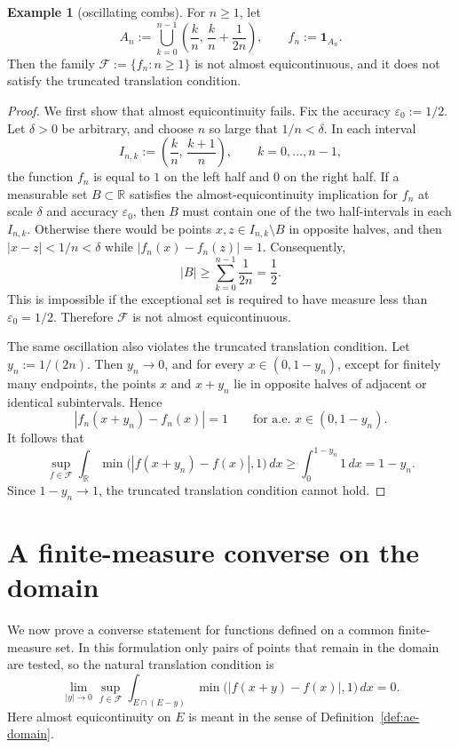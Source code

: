 \documentclass[11pt]{article}
\theoremstyle{plain}
\theoremstyle{definition}
\newtheorem{example}{Example}
\theoremstyle{remark}
\newcommand{\R}{\mathbb{R}}
\newcommand{\F}{\mathcal{F}}
\newcommand{\eps}{\varepsilon}
\newcommand{\meas}[1]{\lvert #1\rvert}
\begin{document}
\begin{example}[oscillating combs]\label{ex:combs}
For $n\ge1$, let
\[
    A_n:=
    \bigcup_{k=0}^{n-1}
    \left(\frac{k}{n},\,\frac{k}{n}+\frac{1}{2n}\right),
    \qquad
    f_n:=\mathbf 1_{A_n}.
\]
Then the family $\F:=\{f_n:n\ge1\}$ is not almost equicontinuous, and it
does not satisfy the truncated translation condition.
\end{example}

\begin{proof}
We first show that almost equicontinuity fails. Fix the accuracy
$\eps_0:=1/2$. Let $\delta>0$ be arbitrary, and choose $n$ so large that
$1/n<\delta$. In each interval
\[
    I_{n,k}:=\left(\frac{k}{n},\,\frac{k+1}{n}\right),
    \qquad k=0,\dots,n-1,
\]
the function $f_n$ is equal to $1$ on the left half and $0$ on the right half.
If a measurable set $B\subset\R$ satisfies the almost-equicontinuity
implication for $f_n$ at scale $\delta$ and accuracy $\eps_0$, then $B$ must
contain one of the two half-intervals in each $I_{n,k}$. Otherwise there
would be points $x,z\in I_{n,k}\setminus B$ in opposite
halves, and then $|x-z|<1/n<\delta$ while $|f_n(x)-f_n(z)|=1$.
Consequently,
\[
    \meas{B}\ge
    \sum_{k=0}^{n-1}\frac{1}{2n}
    =\frac12.
\]
This is impossible if the exceptional set is required to have measure less
than $\eps_0=1/2$. Therefore $\F$ is not almost equicontinuous.

The same oscillation also violates the truncated translation condition. Let
$y_n:=1/(2n)$. Then $y_n\to0$, and for every
$x\in(0,1-y_n)$, except for finitely many endpoints, the points $x$ and
$x+y_n$ lie in opposite halves of adjacent or identical subintervals. Hence
\[
    |f_n(x+y_n)-f_n(x)|=1
    \qquad\text{for a.e. }x\in(0,1-y_n).
\]
It follows that
\[
    \sup_{f\in\F}
    \int_{\R}\min\bigl(|f(x+y_n)-f(x)|,1\bigr)\,dx
    \ge
    \int_0^{1-y_n}1\,dx
    =1-y_n.
\]
Since $1-y_n\to1$, the truncated translation condition cannot hold.
\end{proof}

\section{A finite-measure converse on the domain}

We now prove a converse statement for functions defined on a common
finite-measure set. In this formulation only pairs of points that remain in
the domain are tested, so the natural translation condition is
\[
    \lim_{|y|\to0}\sup_{f\in\F}
    \int_{E\cap(E-y)}
    \min\bigl(|f(x+y)-f(x)|,1\bigr)\,dx=0.
\]
Here almost equicontinuity on $E$ is meant in the sense of
Definition~\ref{def:ae-domain}.
\end{document}
